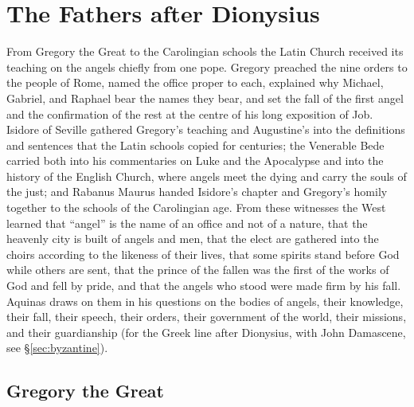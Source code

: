 \section{The Fathers after Dionysius}\label{sec:fathers-after}

From Gregory the Great to the Carolingian schools the Latin Church received
its teaching on the angels chiefly from one pope. Gregory preached the nine
orders to the people of Rome, named the office proper to each, explained why
Michael, Gabriel, and Raphael bear the names they bear, and set the fall of
the first angel and the confirmation of the rest at the centre of his long
exposition of Job. Isidore of Seville gathered Gregory's teaching and
Augustine's into the definitions and sentences that the Latin schools copied
for centuries; the Venerable Bede carried both into his commentaries on Luke
and the Apocalypse and into the history of the English Church, where angels
meet the dying and carry the souls of the just; and Rabanus Maurus handed
Isidore's chapter and Gregory's homily together to the schools of the
Carolingian age. From these witnesses the West learned that ``angel'' is the
name of an office and not of a nature, that the heavenly city is built of
angels and men, that the elect are gathered into the choirs according to the
likeness of their lives, that some spirits stand before God while others are
sent, that the prince of the fallen was the first of the works of God and
fell by pride, and that the angels who stood were made firm by his fall.
Aquinas draws on them in his questions on the bodies of angels, their
knowledge, their fall, their speech, their orders, their government of the
world, their missions, and their guardianship (for the Greek line after
Dionysius, with John Damascene, see \S\ref{sec:byzantine}).

\sectionguard
\subsection{Gregory the Great}\label{sec:fa-gregory}

